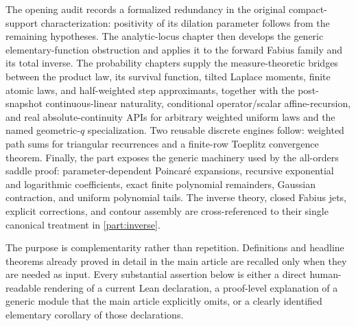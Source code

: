 \documentclass[11pt,oneside]{article}
\theoremstyle{definition}
\theoremstyle{remark}
\begin{document}
The opening audit records a formalized redundancy in the original compact-support
characterization: positivity of its dilation parameter follows from the remaining
hypotheses.  The analytic-locus chapter then develops the generic elementary-function
obstruction and applies it to the forward Fabius family and its total inverse.  The
probability chapters supply the measure-theoretic bridges between the product law, its
survival function, tilted Laplace moments, finite atomic laws, and half-weighted step
approximants, together with the post-snapshot continuous-linear naturality, conditional
operator/scalar affine-recursion, and real absolute-continuity APIs for arbitrary weighted
uniform laws and the named geometric-\(q\) specialization.  Two reusable
discrete engines follow: weighted path sums for triangular
recurrences and a finite-row Toeplitz convergence theorem.  Finally, the part exposes the
generic machinery used by the all-orders saddle proof: parameter-dependent Poincar\'e
expansions, recursive exponential and logarithmic coefficients, exact finite polynomial
remainders, Gaussian contraction, and uniform polynomial tails.  The inverse theory,
closed Fabius jets, explicit corrections, and contour assembly are cross-referenced to their
single canonical treatment in \cref{part:inverse}.

The purpose is complementarity rather than repetition.  Definitions and headline theorems
already proved in detail in the main article are recalled only when they are needed as input.
Every substantial assertion below is either a direct human-readable rendering of a current
Lean declaration, a proof-level explanation of a generic module that the main article
explicitly omits, or a clearly identified elementary corollary of those declarations.
\end{document}

